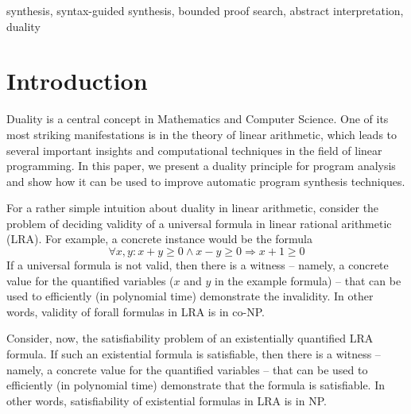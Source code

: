\documentclass[preprint]{sig-alternate-05-2015}
\begin{document}

\keywords
synthesis, syntax-guided synthesis, bounded proof search, abstract interpretation, duality



\section{Introduction}
\label{sec:intro}

Duality is a central concept in Mathematics and Computer Science.
One of its most striking manifestations is in the
theory of linear arithmetic, which leads to 
several important insights and computational techniques
in the field of linear programming.
In this paper, we present a duality principle for program analysis
and show how it can be used to improve automatic program synthesis
techniques.

For a rather simple intuition about duality in linear arithmetic, 
consider the problem of deciding
validity of a universal formula in linear rational arithmetic (LRA).
For example, a concrete instance would be the formula
$$
 \forall{x,y}: x+y\geq 0\wedge x-y\geq 0 \Rightarrow x+1 \geq 0
$$
If a universal formula is not valid, then there is a witness -- namely,
a concrete value for the quantified variables ($x$ and $y$ in the 
example formula) -- that can be used to efficiently (in polynomial time)
demonstrate the invalidity. 
In other words, %
validity of forall formulas
in LRA is in co-NP.

Consider, now, the satisfiability problem of an existentially
quantified LRA formula.
If such an existential formula is satisfiable, then there is a witness -- 
namely, a concrete value for the quantified variables -- that can be used 
to efficiently (in polynomial time) demonstrate that the formula
is satisfiable. 
In other words, %
satisfiability of existential formulas
in LRA is in NP.
\end{document}
